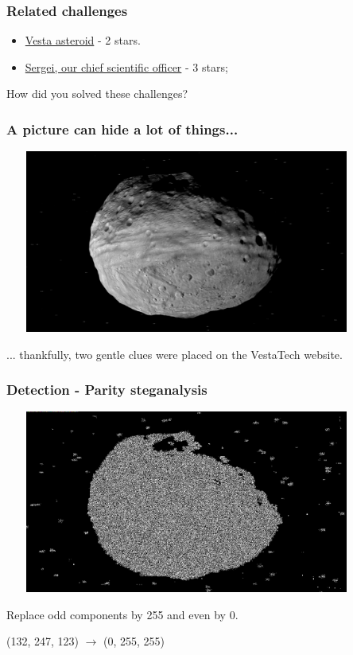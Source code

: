 \documentclass[]{beamer}
\begin{document}
\begin{frame}
\frametitle{Related challenges}
\begin{itemize}
    \item \href{https://github.com/cscluxembourg/vestatech/blob/master/challenges/Vesta-asteroid/vesta.png}{Vesta asteroid} - 2 stars.
    \item \href{https://github.com/cscluxembourg/vestatech/blob/master/challenges/sergei/Sergei.png}{Sergei, our chief scientific officer} - 3 stars;
\end{itemize}
\bigskip
How did you solved these challenges?
\end{frame}

\begin{frame}
\frametitle{A picture can hide a lot of things...}
\begin{center}
    \includegraphics[height=6.0cm, width=12.0cm]{./images/vesta.png}
\end{center}
... thankfully, two gentle clues were placed on the VestaTech website.
\end{frame}

\begin{frame}
\frametitle{Detection - Parity steganalysis}
\begin{center}
    \includegraphics[height=6.0cm, width=12.0cm]{./images/vesta_steg.png}
\end{center}
Replace odd components by 255 and even by 0.

(132, 247, 123) $\longrightarrow$ (0, 255, 255)
\end{frame}
\end{document}
